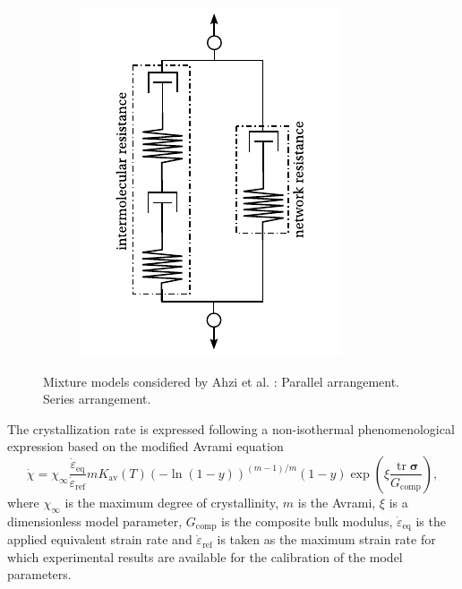 \begin{figure}[hbtp]
\begin{subfigure}[b]{0.45\textwidth}
						\includegraphics[width=\textwidth]{figures/ahzi_series}
						\caption{}
						\label{subfig:ahzi_series}
		\end{subfigure}
	\caption{Mixture models considered by Ahzi et al. \citep{ahziModelingDeformationBehavior2003}:  Parallel arrangement.  Series arrangement.}
\label{fig:ahzi_combiniations}
\end{figure}
The crystallization rate is expressed following a non-isothermal phenomenological expression based on the modiﬁed Avrami equation
\begin{equation}
  \label{eq:rate_eq_cryst}
	\dot \chi = \chi_\infty \frac{\dot\varepsilon_\text{eq}}{\dot\varepsilon_\text{ref} } m K_\text{av}(T) (-\ln(1-y))^{(m-1)/m} (1-y)\exp\left(\xi\frac{\operatorname{tr} \bm \sigma}{G_\text{comp}}\right),
\end{equation}
where $\chi_\infty$ is the maximum degree of crystallinity, $m$ is the Avrami, $\xi$ is a dimensionless model parameter, $G_\text{comp}$ is the composite bulk modulus, $\dot \varepsilon_\text{eq}$ is the applied equivalent strain rate and $\dot\varepsilon_\text{ref}$ is taken as the maximum strain rate for which experimental results are available for the calibration of the model parameters.
